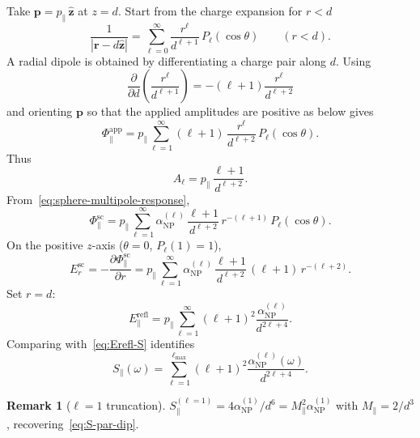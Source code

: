 \documentclass[11pt,a4paper]{article}
\theoremstyle{definition}
\newtheorem{remark}{Remark}[section]
\newcommand{\alphanp}{\alpha_{\text{NP}}}
\newcommand{\p}{\mathbf{p}}
\begin{document}
\noindent
Take $\p = p_\parallel\,\hat{\mathbf{z}}$ at $z=d$. Start from the charge expansion for $r<d$
\begin{equation}
  \frac{1}{|\mathbf{r}-d\hat{\mathbf{z}}|}
  =
  \sum_{\ell=0}^{\infty}
  \frac{r^{\ell}}{d^{\ell+1}}\, P_\ell(\cos\theta)
  \qquad (r<d).
\end{equation}
A radial dipole is obtained by differentiating a charge pair along $d$. Using
\begin{equation}
  \frac{\partial}{\partial d}\!\left(\frac{r^{\ell}}{d^{\ell+1}}\right)
  =
  -(\ell+1)\frac{r^{\ell}}{d^{\ell+2}}
\end{equation}
and orienting $\p$ so that the applied amplitudes are positive as below gives
\begin{equation}
  \Phi_\parallel^{\mathrm{app}}
  =
  p_\parallel
  \sum_{\ell=1}^{\infty}
  (\ell+1)\,
  \frac{r^{\ell}}{d^{\ell+2}}\,
  P_\ell(\cos\theta).
  \label{eq:Phi-par-app}
\end{equation}
Thus
\begin{equation}
  A_\ell
  =
  p_\parallel\,
  \frac{\ell+1}{d^{\ell+2}}.
  \label{eq:A-ell-par}
\end{equation}
From~\eqref{eq:sphere-multipole-response},
\begin{equation}
  \Phi_\parallel^{\mathrm{sc}}
  =
  p_\parallel
  \sum_{\ell=1}^{\infty}
  \alphanp^{(\ell)}\,
  \frac{\ell+1}{d^{\ell+2}}\,
  r^{-(\ell+1)}\,
  P_\ell(\cos\theta).
  \label{eq:Phi-par-sc}
\end{equation}
On the positive $z$-axis ($\theta=0$, $P_\ell(1)=1$),
\begin{equation}
  E_r^{\mathrm{sc}}
  =
  -\frac{\partial\Phi_\parallel^{\mathrm{sc}}}{\partial r}
  =
  p_\parallel
  \sum_{\ell=1}^{\infty}
  \alphanp^{(\ell)}\,
  \frac{\ell+1}{d^{\ell+2}}\,
  (\ell+1)\, r^{-(\ell+2)}.
\end{equation}
Set $r=d$:
\begin{equation}
  E_\parallel^{\mathrm{refl}}
  =
  p_\parallel
  \sum_{\ell=1}^{\infty}
  (\ell+1)^2
  \frac{\alphanp^{(\ell)}}{d^{2\ell+4}}.
\end{equation}
Comparing with~\eqref{eq:Erefl-S} identifies
\begin{equation}
  S_\parallel(\omega)
  =
  \sum_{\ell=1}^{\ell_{\max}}
  (\ell+1)^2
  \frac{\alphanp^{(\ell)}(\omega)}{d^{2\ell+4}}.
  \label{eq:S-par-multi}
\end{equation}

\begin{remark}[$\ell=1$ truncation]
\noindent
$S_\parallel^{(\ell=1)}=4\alphanp^{(1)}/d^6=M_\parallel^2\alphanp^{(1)}$ with $M_\parallel=2/d^3$, recovering~\eqref{eq:S-par-dip}.
\end{remark}
\end{document}
